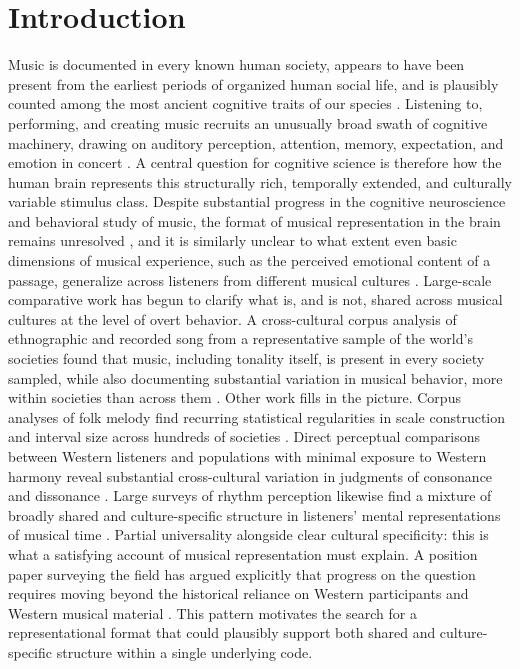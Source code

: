 \documentclass[pdflatex,sn-nature]{sn-jnl}
\begin{document}
\section{Introduction}

Music is documented in every known human society, appears to have been present from the
earliest periods of organized human social life, and is plausibly counted among the most
ancient cognitive traits of our species \cite{pearce2012,zatorre2013}. Listening to,
performing, and creating music recruits an unusually broad swath of cognitive machinery,
drawing on auditory perception, attention, memory, expectation, and emotion in concert
\cite{zatorre2005}. A central question for cognitive science is therefore how the human
brain represents this structurally rich, temporally extended, and culturally variable
stimulus class. Despite substantial progress in the cognitive neuroscience and behavioral
study of music, the format of musical representation in the brain remains unresolved
\cite{sankaran2018}, and it is similarly unclear to what extent even basic dimensions of
musical experience, such as the perceived emotional content of a passage, generalize
across listeners from different musical cultures \cite{vuust2022}. Large-scale
comparative work has begun to clarify what is, and is not, shared across musical cultures
at the level of overt behavior. A cross-cultural corpus analysis of ethnographic and
recorded song from a representative sample of the world's societies found that music,
including tonality itself, is present in every society sampled, while also documenting
substantial variation in musical behavior, more within societies than across them
\cite{mehr2019}. Other work fills in the picture. Corpus analyses of folk melody find recurring statistical
regularities in scale construction and interval size across hundreds of societies
\cite{savage2015}. Direct perceptual comparisons between Western listeners and
populations with minimal exposure to Western harmony reveal substantial cross-cultural
variation in judgments of consonance and dissonance \cite{mcdermott2016}. Large surveys
of rhythm perception likewise find a mixture of broadly shared and culture-specific
structure in listeners' mental representations of musical time \cite{jacoby2024}. Partial universality alongside clear
cultural specificity: this is what a satisfying account of musical representation must
explain. A position paper surveying the field has argued explicitly that progress on the
question requires moving beyond the historical reliance on Western participants and
Western musical material \cite{jacoby2020}. This pattern
motivates the search for a representational format that could plausibly support both
shared and culture-specific structure within a single underlying code.
\end{document}
